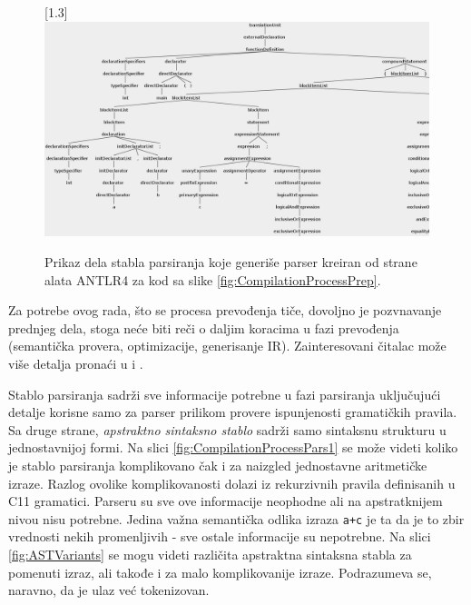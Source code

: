 \begin{figure}[h!]
    \centering
    \scalebox{0.95}[1.3] {
        \includegraphics[width=\textwidth]{images/parse_tree.png}
    }
    \caption{Prikaz dela stabla parsiranja koje generiše parser kreiran od strane alata ANTLR4 za kod sa slike \ref{fig:CompilationProcessPrep}.}
    \label{fig:CompilationProcessPars}
\end{figure}

Za potrebe ovog rada, što se procesa prevođenja tiče, dovoljno je pozvnavanje prednjeg dela, stoga neće biti reči o daljim koracima u fazi prevođenja (semantička provera, optimizacije, generisanje IR). Zainteresovani čitalac može više detalja pronaći u \cite{EngineeringCompilers} i \cite{CompilerConstruction}. 

Stablo parsiranja sadrži sve informacije potrebne u fazi parsiranja uključujući detalje korisne samo za parser prilikom provere ispunjenosti gramatičkih pravila. Sa druge strane, \emph{apstraktno sintaksno stablo} sadrži samo sintaksnu strukturu u jednostavnijoj formi. Na slici \ref{fig:CompilationProcessPars1} se može videti koliko je stablo parsiranja komplikovano čak i za naizgled jednostavne aritmetičke izraze. Razlog ovolike komplikovanosti dolazi iz rekurzivnih pravila definisanih u C11 gramatici. Parseru su sve ove informacije neophodne ali na apstratknijem nivou nisu potrebne. Jedina važna semantička odlika izraza \texttt{a+c} je ta da je to zbir vrednosti nekih promenljivih - sve ostale informacije su nepotrebne. Na slici \ref{fig:ASTVariants} se mogu videti različita apstraktna sintaksna stabla za pomenuti izraz, ali takođe i za malo komplikovanije izraze. Podrazumeva se, naravno, da je ulaz već tokenizovan. 

